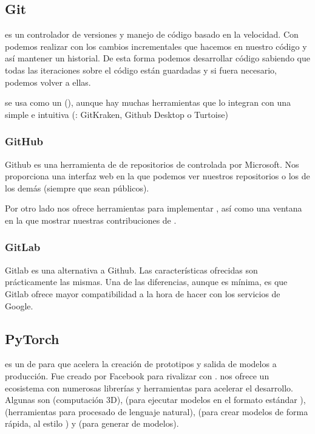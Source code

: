 \subsection{Git}

 es un controlador de versiones y manejo de código basado en la velocidad. Con  podemos realizar  con los cambios incrementales que hacemos en nuestro código y así mantener un historial. De esta forma podemos desarrollar código sabiendo que todas las iteraciones sobre el código están guardadas y si fuera necesario, podemos volver a ellas.

 se usa como un  (), aunque hay muchas herramientas que lo integran con una  simple e intuitiva (\pe: GitKraken, Github Desktop o Turtoise)

\subsubsection{GitHub}

Github es una herramienta de  de repositorios de  controlada por Microsoft. Nos proporciona una interfaz web en la que podemos ver nuestros repositorios o los de los demás (siempre que sean públicos).

Por otro lado nos ofrece herramientas para implementar , así como una ventana en la que mostrar nuestras contribuciones de .


\subsubsection{GitLab}

Gitlab es una alternativa a Github. Las características ofrecidas son prácticamente las mismas. Una de las diferencias, aunque es mínima, es que Gitlab ofrece mayor compatibilidad a la hora de hacer  con los servicios de Google.


\subsection{PyTorch}

 es un  de  para  que acelera la creación de prototipos y salida de modelos a producción. Fue creado por Facebook para rivalizar con .  nos ofrece un ecosistema con numerosas librerías y herramientas para acelerar el desarrollo. Algunas son  (computación 3D),  (para ejecutar modelos en el formato estándar ),  (herramientas para procesado de lenguaje natural),  (para crear modelos de forma rápida, al estilo ) y  (para generar  de modelos).

